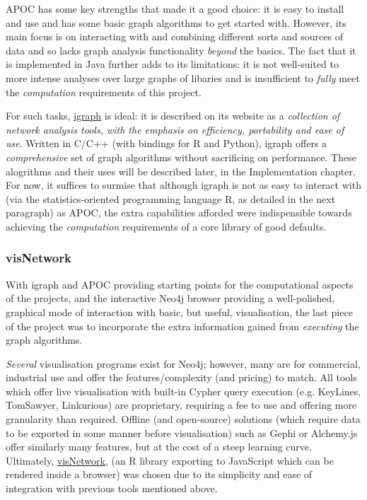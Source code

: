 APOC has some key strengths that made it a good choice: it is easy to install
and use and has some basic graph algorithms to get started with.  However, its
main focus is on interacting with and combining different sorts and sources of
data and so lacks graph analysis functionality \emph{beyond} the basics. The
fact that it is implemented in Java further adds to its limitations: it is not
well-suited to more intense analyses over large graphs of libaries and is
insufficient to \emph{fully} meet the \emph{computation} requirements of this
project.

For such tasks, \href{http://www.igraph.org}{igraph} is ideal: it is described
on its website as a \emph{collection of network analysis tools, with the
emphasis on efficiency, portability and ease of use}. Written in C/C++ (with
bindings for R and Python), igraph offers a \emph{comprehensive} set of graph
algorithms without sacrificing on performance. These alogrithms and their uses
will be described later, in the Implementation chapter. For now, it suffices to
surmise that although igraph is not as easy to interact with (via the
statistics-oriented programming language R, as detailed in the next paragraph)
as APOC, the extra capabilities afforded were indispensible towards achieving
the \emph{computation} requirements of a core library of good defaults.

\subsubsection{visNetwork}

With igraph and APOC providing starting points for the computational aspects of
the projects, and the interactive Neo4j browser providing a well-polished,
graphical mode of interaction with basic, but useful, visualisation, the last
piece of the project was to incorporate the extra information gained from
\emph{executing} the graph algorithms.

\emph{Several} visualisation programs exist for Neo4j; however, many are for
commercial, industrial use and offer the features/complexity (and pricing) to
match. All tools which offer live visualisation with built-in Cypher query
execution (e.g. KeyLines, TomSawyer, Linkurious) are proprietary, requiring a
fee to use and offering more granularity than required. Offline (and
open-source) solutions (which require data to be exported in some manner before
visualisation) such as Gephi or Alchemy.js offer similarly many features, but at
the cost of a steep learning curve.  Ultimately,
\href{http://datastorm-open.github.io/visNetwork}{visNetwork}, (an R library
exporting to JavaScript which can be rendered inside a browser) was chosen due
to its simplicity and ease of integration with previous tools mentioned above.

